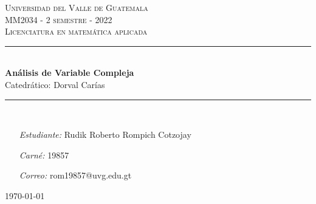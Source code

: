 \begin{titlepage}
\thispagestyle{empty}
\newcommand{\HRule}{\rule{\linewidth}{0.5mm}}
\hspace{1cm}
\center

\textsc{\huge Universidad del Valle de Guatemala}\\[2.0cm]
\textsc{\Large MM2034 - 2 semestre - 2022}\\[0.8cm]
\MSonehalfspacing
\textsc{Licenciatura en matemática aplicada}\\[1.0cm]

\HRule\\[1.4cm]
\MSdoublespacing
{ \huge \bfseries Análisis de Variable Compleja}\\[0.2cm]
{ \large Catedrático: Dorval Carías}\\[0.3cm] %
\HRule \\[2.4cm]
\MSonehalfspacing

\begin{minipage}[t]{0.8\textwidth}
	\begin{itemize}
	\item[\emph{Estudiante:}] Rudik Roberto Rompich Cotzojay
	\item[\emph{Carné:}] 19857
	\item[\emph{Correo:}] rom19857@uvg.edu.gt
	\end{itemize}
\end{minipage}

\vspace{2.9cm}

\flushright \today
\end{titlepage}
\restoregeometry

\tableofcontents
{}
\thispagestyle{empty}

\MSonehalfspacing
\newpage
\setcounter{page}{1}
\pagestyle{fancy}